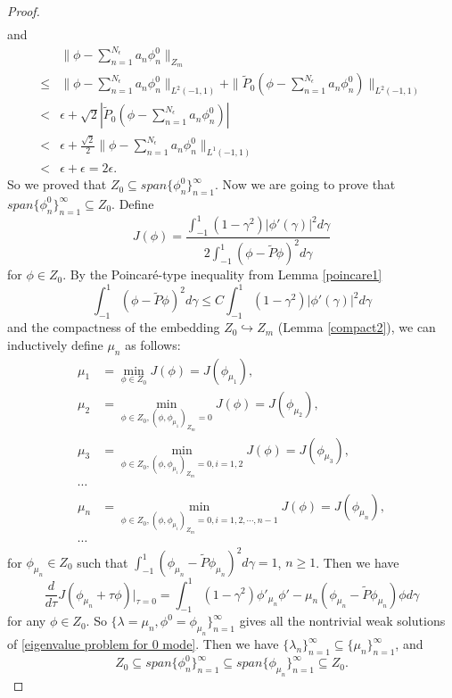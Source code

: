\documentclass[1 [leqno, 11pt]{amsart}
\numberwithin{equation}{section}
\let\ep=\epsilon
\begin{document}
\begin{CJK*}{GBK}{song}
\begin{proof}
\begin{align*}
\end{align*}
and
\begin{align*}
& \|\phi - \sum_{n=1}^{N_\ep} a_n \phi^0_n \|_{Z_m}\\
 \leq & \|\phi - \sum_{n=1}^{N_\ep} a_n \phi^0_n \|_{L^2(-1,1)} + \| \tilde{P}_0( \phi - \sum_{n=1}^{N_\ep} a_n \phi^0_n) \|_{L^2(-1,1)} \\
 < & \ep + \sqrt{2} |\tilde{P}_0( \phi - \sum_{n=1}^{N_\ep} a_n \phi^0_n)| \\
 < & \ep + \frac{\sqrt{2} }{2} \|\phi - \sum_{n=1}^{N_\ep} a_n \phi^0_n\|_{L^1(-1,1)} \\
 < & \ep + \ep = 2\ep.
\end{align*}
So we proved that $Z_0 \subseteq span \{\phi_n^0\}_{n=1}^\infty$. Now we are going to prove that $span \{\phi_n^0\}_{n=1}^\infty \subseteq Z_0$. Define
$$J(\phi) = \frac{\int_{-1}^1(1-\gamma^2)|\phi'(\gamma)|^2 d\gamma }{2\int_{-1}^1 (\phi - \tilde{P}\phi)^2 d \gamma}$$
for $\phi \in Z_0$. By the Poincar\'e-type inequality from Lemma \ref{poincare1}
$$\int_{-1}^1 (\phi - \tilde{P}\phi)^2 d \gamma \leq C \int_{-1}^1(1-\gamma^2)|\phi'(\gamma)|^2 d\gamma$$
and the compactness of the embedding $Z_0 \hookrightarrow Z_m$ (Lemma \ref{compact2}), we can inductively define $\mu_n$ as follows:
\begin{align*}
\mu_1 &= \min_{\phi \in Z_0} J(\phi) = J(\phi_{\mu_1}), \\
\mu_2 &= \min_{\phi \in Z_0, (\phi, \phi_{\mu_1})_{Z_m} = 0} J(\phi) = J(\phi_{\mu_2}),\\
\mu_3 &= \min_{\phi \in Z_0, (\phi, \phi_{\mu_i})_{Z_m} = 0, i = 1, 2} J(\phi) = J(\phi_{\mu_3}),\\
\cdots\\
\mu_n &= \min_{\phi \in Z_0, (\phi, \phi_{\mu_i})_{Z_m} = 0, i = 1, 2, \cdots, n-1} J(\phi) = J(\phi_{\mu_n}),\\
\cdots
\end{align*}
for $\phi_{\mu_n} \in Z_0$ such that $\int_{-1}^1 (\phi_{\mu_n} - \tilde{P}\phi_{\mu_n})^2 d \gamma = 1$, $n \geq 1$. Then we have
$$\frac{d}{d \tau} J(\phi_{\mu_n} + \tau \phi)|_{\tau = 0} = \int_{-1}^1 (1-\gamma^2)\phi'_{\mu_n}\phi' - \mu_n (\phi_{\mu_n} - \tilde{P}\phi_{\mu_n})\phi d \gamma$$
for any $\phi \in Z_0$. So $\{\lambda = \mu_n, \phi^0 = \phi_{\mu_n}\}_{n=1}^\infty$ gives all the nontrivial weak solutions of \eqref{eigenvalue problem for 0 mode}. Then we have $\{\lambda_n\}_{n=1}^\infty \subseteq \{\mu_n\}_{n=1}^\infty$, and
$$Z_0 \subseteq span\{\phi^0_n\}_{n=1}^\infty \subseteq span\{\phi_{\mu_n}\}_{n=1}^\infty \subseteq Z_0.$$

\end{proof}
\end{CJK*}
\end{document}
